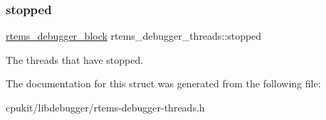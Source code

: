 \subsubsection{\texorpdfstring{stopped}{stopped}}
{\footnotesize\ttfamily \mbox{\hyperlink{structrtems__debugger__block}{rtems\+\_\+debugger\+\_\+block}} rtems\+\_\+debugger\+\_\+threads\+::stopped}

The threads that have stopped. 

The documentation for this struct was generated from the following file\+:\begin{DoxyCompactItemize}
\item 
cpukit/libdebugger/rtems-\/debugger-\/threads.\+h\end{DoxyCompactItemize}

